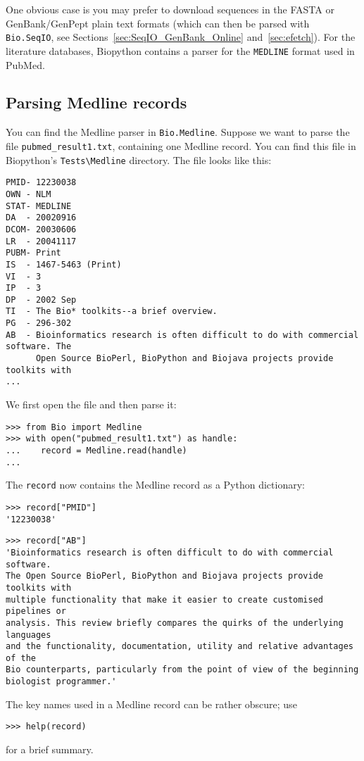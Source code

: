 \documentclass{report}
\begin{document}
One obvious case is you may prefer to download sequences in the FASTA or GenBank/GenPept plain text formats (which can then be parsed with \verb|Bio.SeqIO|, see Sections~\ref{sec:SeqIO_GenBank_Online} and~\ref{sec:efetch}).  For the literature databases, Biopython contains a parser for the \verb+MEDLINE+ format used in PubMed.

\subsection{Parsing Medline records}
\label{subsec:entrez-and-medline}
You can find the Medline parser in \verb+Bio.Medline+. Suppose we want to parse the file \verb+pubmed_result1.txt+, containing one Medline record. You can find this file in Biopython's \verb+Tests\Medline+ directory. The file looks like this:

\begin{verbatim}
PMID- 12230038
OWN - NLM
STAT- MEDLINE
DA  - 20020916
DCOM- 20030606
LR  - 20041117
PUBM- Print
IS  - 1467-5463 (Print)
VI  - 3
IP  - 3
DP  - 2002 Sep
TI  - The Bio* toolkits--a brief overview.
PG  - 296-302
AB  - Bioinformatics research is often difficult to do with commercial software. The
      Open Source BioPerl, BioPython and Biojava projects provide toolkits with
...
\end{verbatim}
We first open the file and then parse it:
\begin{verbatim}
>>> from Bio import Medline
>>> with open("pubmed_result1.txt") as handle:
...    record = Medline.read(handle)
...
\end{verbatim}
The \verb+record+ now contains the Medline record as a Python dictionary:
\begin{verbatim}
>>> record["PMID"]
'12230038'
\end{verbatim}
\begin{verbatim}
>>> record["AB"]
'Bioinformatics research is often difficult to do with commercial software.
The Open Source BioPerl, BioPython and Biojava projects provide toolkits with
multiple functionality that make it easier to create customised pipelines or
analysis. This review briefly compares the quirks of the underlying languages
and the functionality, documentation, utility and relative advantages of the
Bio counterparts, particularly from the point of view of the beginning
biologist programmer.'
\end{verbatim}
The key names used in a Medline record can be rather obscure; use
\begin{verbatim}
>>> help(record)
\end{verbatim}
for a brief summary.
\end{document}
